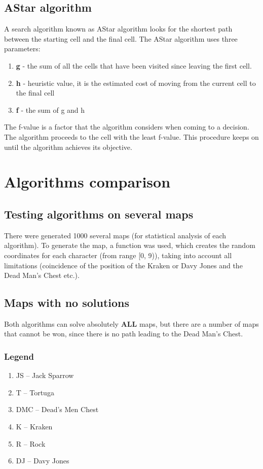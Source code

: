 \documentclass[a4paper,12pt]{article}
\begin{document}
\subsection{AStar algorithm}
A search algorithm known as AStar algorithm looks for the shortest path between the starting cell and the final cell. The AStar algorithm uses three parameters:
\begin{enumerate}
    \item \textbf{g} - the sum of all the cells that have been visited since leaving the first cell.
    \item \textbf{h} - heuristic value, it is the estimated cost of moving from the current cell to the final cell
    \item \textbf{f} - the sum of g and h
\end{enumerate}
The f-value is a factor that the algorithm considers when coming to a decision. The algorithm proceeds to the cell with the least f-value. This procedure keeps on until the algorithm achieves its objective.

\section{Algorithms comparison}
\subsection{Testing algorithms on several maps}
There were generated 1000 several maps (for statistical analysis of each algorithm). To generate the map, a function was used, which creates the random coordinates for each character (from range [0, 9)), taking into account all limitations (coincidence of the position of the Kraken or Davy Jones and the Dead Man's Chest etc.).

\subsection{Maps with no solutions}
Both algorithms can solve absolutely \textbf{ALL} maps, but there are a number of maps that cannot be won, since there is no path leading to the Dead Man's Chest.
\subsubsection{Legend}
\begin{enumerate}
    \item JS – Jack Sparrow
    \item T – Tortuga
    \item DMC – Dead’s Men Chest 
    \item K – Kraken
    \item R – Rock
    \item DJ – Davy Jones
\end{enumerate}
\end{document}
